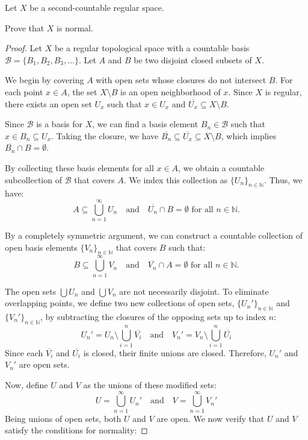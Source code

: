 \documentclass[11pt]{article}
\begin{document}
\begin{prob}
    Let $X$ be a second-countable regular 
    space. 

    Prove that $X$ is normal. 
\end{prob}
\begin{proof}
    Let $X$ be a regular topological space with a countable basis $\mathcal{B} = \{B_1, B_2, B_3, \dots\}$. Let $A$ and $B$ be two disjoint closed subsets of $X$.

    We begin by covering $A$ with open sets whose closures do not intersect $B$. For each point $x \in A$, the set $X \setminus B$ is an open neighborhood of $x$. Since $X$ is regular, there exists an open set $U_x$ such that $x \in U_x$ and $\overline{U_x} \subseteq X \setminus B$. 

    Since $\mathcal{B}$ is a basis for $X$, we can find a basis element $B_n \in \mathcal{B}$ such that $x \in B_n \subseteq U_x$. Taking the closure, we have $\overline{B_n} \subseteq \overline{U_x} \subseteq X \setminus B$, which implies $\overline{B_n} \cap B = \emptyset$. 

    By collecting these basis elements for all $x \in A$, we obtain a countable subcollection of $\mathcal{B}$ that covers $A$. We index this collection as $\{U_n\}_{n \in \mathbb{N}}$. Thus, we have:
    \[
    A \subseteq \bigcup_{n=1}^{\infty} U_n \quad \text{and} \quad \overline{U_n} \cap B = \emptyset \text{ for all } n \in \mathbb{N}.
    \]

    By a completely symmetric argument, we can construct a countable collection of open basis elements $\{V_n\}_{n \in \mathbb{N}}$ that covers $B$ such that:
    \[
    B \subseteq \bigcup_{n=1}^{\infty} V_n \quad \text{and} \quad \overline{V_n} \cap A = \emptyset \text{ for all } n \in \mathbb{N}.
    \]

    The open sets $\bigcup U_n$ and $\bigcup V_n$ are not necessarily disjoint. To eliminate overlapping points, we define two new collections of open sets, $\{U_n'\}_{n \in \mathbb{N}}$ and $\{V_n'\}_{n \in \mathbb{N}}$, by subtracting the closures of the opposing sets up to index $n$:
    \[
    U_n' = U_n \setminus \bigcup_{i=1}^{n} \overline{V_i} \quad \text{and} \quad V_n' = V_n \setminus \bigcup_{i=1}^{n} \overline{U_i}
    \]
    Since each $\overline{V_i}$ and $\overline{U_i}$ is closed, their finite unions are closed. Therefore, $U_n'$ and $V_n'$ are open sets.

    Now, define $U$ and $V$ as the unions of these modified sets:
    \[
    U = \bigcup_{n=1}^{\infty} U_n' \quad \text{and} \quad V = \bigcup_{n=1}^{\infty} V_n'
    \]
    Being unions of open sets, both $U$ and $V$ are open. We now verify that $U$ and $V$ satisfy the conditions for normality:


\end{proof}
\end{document}
